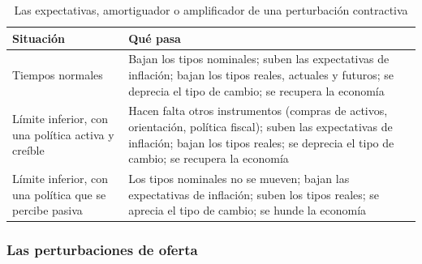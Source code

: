 \documentclass[11pt]{article}
\begin{document}
\begin{table}[H]
\centering
\caption{Las expectativas, amortiguador o amplificador de una perturbación contractiva}\label{tab:expectativas-elb}
\small
\begin{tabular}{>{\raggedright\arraybackslash}p{}>{\raggedright\arraybackslash}p{}}
\toprule
\rowcolor{tceeazulpalido}\textbf{Situación} & \textbf{Qué pasa} \\
\midrule
Tiempos normales & Bajan los tipos nominales; suben las expectativas de inflación; bajan los tipos reales, actuales y futuros; se deprecia el tipo de cambio; se recupera la economía \\
Límite inferior, con una política activa y creíble & Hacen falta otros instrumentos (compras de activos, orientación, política fiscal); suben las expectativas de inflación; bajan los tipos reales; se deprecia el tipo de cambio; se recupera la economía \\
Límite inferior, con una política que se percibe pasiva & Los tipos nominales no se mueven; bajan las expectativas de inflación; suben los tipos reales; se aprecia el tipo de cambio; se hunde la economía \\
\bottomrule
\end{tabular}
\end{table}

\subsubsection{Las perturbaciones de oferta}\label{sec:oferta}
\end{document}
